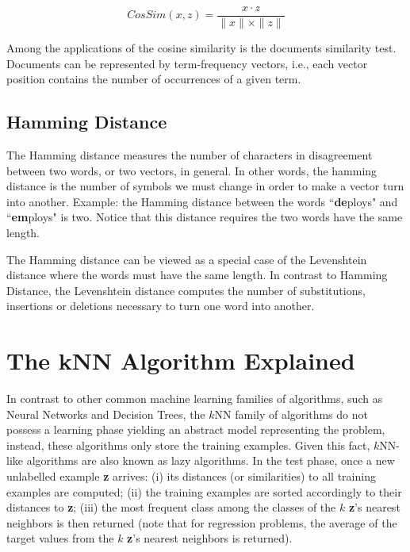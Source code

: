 \begin{equation}
    CosSim(x,z) = \frac{x \cdot z}{\|x\| \times \|z\|}
    \label{eq:cosineSim}
\end{equation}

Among the applications of the cosine similarity is the documents similarity test. Documents can be represented by term-frequency vectors, i.e., each vector position contains the number of occurrences of a given term. 


\subsection{Hamming Distance}

The Hamming distance \cite{hamming:12} measures the number of characters in disagreement between two words, or two vectors, in general. In other words, the hamming distance is the number of symbols we must change in order to make a vector turn into another. Example: the Hamming distance between the words ``\textbf{de}ploys" and ``\textbf{em}ploys" is two. Notice that this distance requires the two words have the same length. 

The Hamming distance can be viewed as a special case of the Levenshtein distance where the words must have the same length. In contrast to Hamming Distance, the Levenshtein distance computes the number of substitutions, insertions or deletions necessary to turn one word into another.


\section{The kNN Algorithm Explained}

In contrast to other common machine learning families of algorithms, such as Neural Networks and Decision Trees, the $k$NN family of algorithms do not possess a learning phase yielding an abstract model representing the problem, instead, these algorithms only store the training examples. Given this fact, $k$NN-like algorithms are also known as lazy algorithms. In the test phase, once a new unlabelled example \textbf{z} arrives: (i) its distances (or similarities) to all training examples are computed; (ii) the training examples are sorted accordingly to their distances to \textbf{z}; (iii) the most frequent class among the classes of the $k$ \textbf{z}'s nearest neighbors is then returned (note that for regression problems, the average of the target values from the $k$ \textbf{z}'s nearest neighbors is returned). 


